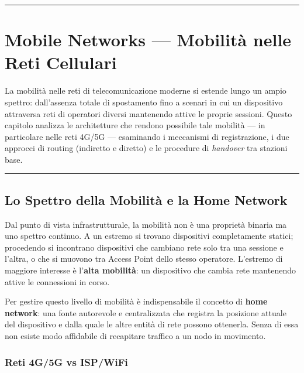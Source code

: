 \documentclass[
  italian,
  openany]{book}
\begin{document}
\begin{center}\rule{0.5\linewidth}{0.5pt}\end{center}

\newpage

\chapter{Mobile Networks --- Mobilità nelle Reti
Cellulari}\label{mobile-networks-mobilituxe0-nelle-reti-cellulari}

La mobilità nelle reti di telecomunicazione moderne si estende lungo un
ampio spettro: dall'assenza totale di spostamento fino a scenari in cui
un dispositivo attraversa reti di operatori diversi mantenendo attive le
proprie sessioni. Questo capitolo analizza le architetture che rendono
possibile tale mobilità --- in particolare nelle reti 4G/5G ---
esaminando i meccanismi di registrazione, i due approcci di routing
(indiretto e diretto) e le procedure di \emph{handover} tra stazioni
base.

\begin{center}\rule{0.5\linewidth}{0.5pt}\end{center}

\section{Lo Spettro della Mobilità e la Home
Network}\label{lo-spettro-della-mobilituxe0-e-la-home-network}

Dal punto di vista infrastrutturale, la mobilità non è una proprietà
binaria ma uno spettro continuo. A un estremo si trovano dispositivi
completamente statici; procedendo si incontrano dispositivi che cambiano
rete solo tra una sessione e l'altra, o che si muovono tra Access Point
dello stesso operatore. L'estremo di maggiore interesse è l'\textbf{alta
mobilità}: un dispositivo che cambia rete mantenendo attive le
connessioni in corso.

Per gestire questo livello di mobilità è indispensabile il concetto di
\textbf{home network}: una fonte autorevole e centralizzata che registra
la posizione attuale del dispositivo e dalla quale le altre entità di
rete possono ottenerla. Senza di essa non esiste modo affidabile di
recapitare traffico a un nodo in movimento.

\subsection{Reti 4G/5G vs ISP/WiFi}\label{reti-4g5g-vs-ispwifi}
\end{document}
